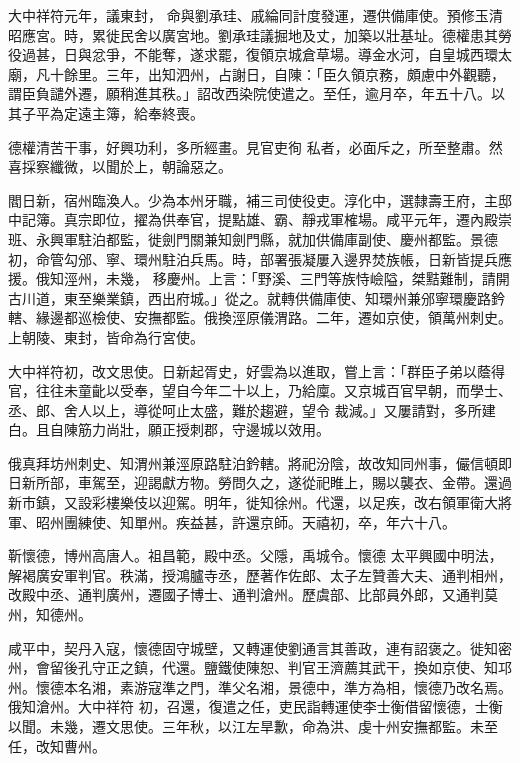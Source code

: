 \begin{pinyinscope}
 大中祥符元年，議東封，
 命與劉承珪、戚綸同計度發運，遷供備庫使。預修玉清昭應宮。時，累徙民舍以廣宮地。劉承珪議掘地及丈，加築以壯基址。德權患其勞役過甚，日與忿爭，不能奪，遂求罷，復領京城倉草場。導金水河，自皇城西環太廟，凡十餘里。三年，出知泗州，占謝日，自陳：「臣久領京務，頗慮中外觀聽，謂臣負譴外遷，願稍進其秩。」詔改西染院使遣之。至任，逾月卒，年五十八。以其子平為定遠主簿，給奉終喪。



 德權清苦干事，好興功利，多所經畫。見官吏徇
 私者，必面斥之，所至整肅。然喜採察纖微，以聞於上，朝論惡之。



 閻日新，宿州臨渙人。少為本州牙職，補三司使役吏。淳化中，選隸壽王府，主邸中記簿。真宗即位，擢為供奉官，提點雄、霸、靜戎軍榷場。咸平元年，遷內殿崇班、永興軍駐泊都監，徙劍門關兼知劍門縣，就加供備庫副使、慶州都監。景德初，命管勾邠、寧、環州駐泊兵馬。時，部署張凝屢入邊界焚族帳，日新皆提兵應援。俄知涇州，未幾，
 移慶州。上言：「野溪、三門等族恃嶮隘，桀黠難制，請開古川道，東至樂業鎮，西出府城。」從之。就轉供備庫使、知環州兼邠寧環慶路鈐轄、緣邊都巡檢使、安撫都監。俄換涇原儀渭路。二年，遷如京使，領萬州刺史。上朝陵、東封，皆命為行宮使。



 大中祥符初，改文思使。日新起胥史，好雲為以進取，嘗上言：「群臣子弟以蔭得官，往往未童齔以受奉，望自今年二十以上，乃給廩。又京城百官早朝，而學士、丞、郎、舍人以上，導從呵止太盛，難於趨避，望令
 裁減。」又屢請對，多所建白。且自陳筋力尚壯，願正授刺郡，守邊城以效用。



 俄真拜坊州刺史、知渭州兼涇原路駐泊鈐轄。將祀汾陰，故改知同州事，儼信頓即日新所部，車駕至，迎謁獻方物。勞問久之，遂從祀睢上，賜以襲衣、金帶。還過新市鎮，又設彩樓樂伎以迎駕。明年，徙知徐州。代還，以足疾，改右領軍衛大將軍、昭州團練使、知單州。疾益甚，許還京師。天禧初，卒，年六十八。



 靳懷德，博州高唐人。祖昌範，殿中丞。父隱，禹城令。懷德
 太平興國中明法，解褐廣安軍判官。秩滿，授鴻臚寺丞，歷著作佐郎、太子左贊善大夫、通判相州，改殿中丞、通判廣州，遷國子博士、通判滄州。歷虞部、比部員外郎，又通判莫州，知德州。



 咸平中，契丹入寇，懷德固守城壁，又轉運使劉通言其善政，連有詔褒之。徙知密州，會留後孔守正之鎮，代還。鹽鐵使陳恕、判官王濟薦其武干，換如京使、知邛州。懷德本名湘，素游寇準之門，準父名湘，景德中，準方為相，懷德乃改名焉。俄知滄州。大中祥符
 初，召還，復遣之任，吏民詣轉運使李士衡借留懷德，士衡以聞。未幾，遷文思使。三年秋，以江左旱歉，命為洪、虔十州安撫都監。未至任，改知曹州。




\end{pinyinscope}
